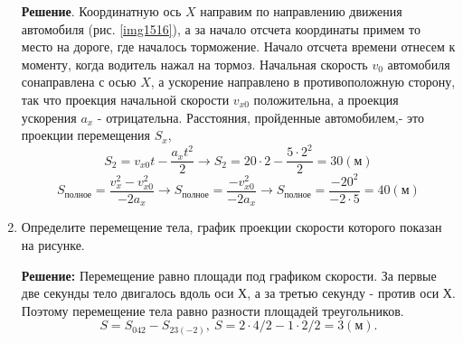 \documentclass[a5paper, 10pt]{diss_4}
\renewcommand{\'}{\,'}
\begin{document}
\begin{enumerate}
{ \textbf{Решение}. Координатную ось $X$ направим по направлению движения
автомобиля (рис. \ref{img1516}), а за начало отсчета координаты примем то место на дороге,
где началось торможение. Начало отсчета времени отнесем к моменту, когда
водитель нажал на тормоз. Начальная скорость $v_0$ автомобиля сонаправлена с осью
$X$, а ускорение направлено в противоположную сторону, так что проекция начальной
скорости $v_{x0}$ положительна, а проекция ускорения $a_x$ - отрицательна. Расстояния,
пройденные автомобилем,- это проекции перемещения $S_x$,
\[
S_2=v_{x0}t-\frac{a_x t^2}{2}\to S_2=20\cdot 2-\frac{5\cdot 2^2}{2}=30(м)
\]
\[
S_{полное}=\frac{v_x^2-v_{x0}^2}{-2a_x}\to S_{полное}=\frac{-v_{x0}^2}{-2a_x}\to
S_{полное}=\frac{-20^2}{-2\cdot 5}=40(м)
\]
}
\item {
Определите перемещение тела, график проекции скорости которого показан на
рисунке.

 \textbf{Решение:} Перемещение равно площади под графиком скорости. За первые
две секунды тело двигалось вдоль оси $Х$, а за третью секунду - против оси $Х$.
Поэтому перемещение тела равно разности площадей треугольников.
\[
S = S_{042}-S_{23(-2)},\ S = 2\cdot 4/2-1\cdot 2/2= 3(м).
\]

}
\end{enumerate}
\end{document}
